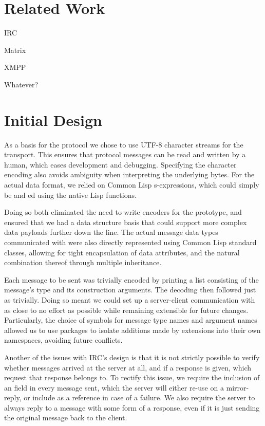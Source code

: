 \documentclass[format=sigconf]{acmart}
\begin{document}
\section{Related Work}\label{relatedwork}
IRC

Matrix

XMPP

Whatever?

\section{Initial Design}\label{initial-design}
As a basis for the protocol we chose to use UTF-8 character streams for the transport. This ensures that protocol messages can be read and written by a human, which eases development and debugging. Specifying the character encoding also avoids ambiguity when interpreting the underlying bytes. For the actual data format, we relied on Common Lisp s-expressions, which could simply be  and ed using the native Lisp functions.

Doing so both eliminated the need to write encoders for the prototype, and ensured that we had a data structure basis that could support more complex data payloads further down the line. The actual message data types communicated with were also directly represented using Common Lisp standard classes, allowing for tight encapsulation of data attributes, and the natural combination thereof through multiple inheritance.

Each message to be sent was trivially encoded by printing a list consisting of the message's type and its construction arguments. The decoding then followed just as trivially. Doing so meant we could set up a server-client communication with as close to no effort as possible while remaining extensible for future changes. Particularly, the choice of symbols for message type names and argument names allowed us to use packages to isolate additions made by extensions into their own namespaces, avoiding future conflicts.

Another of the issues with IRC's design is that it is not strictly possible to verify whether messages arrived at the server at all, and if a response is given, which request that response belongs to. To rectify this issue, we require the inclusion of an  field in every message sent, which the server will either re-use on a mirror-reply, or include as a reference in case of a failure. We also require the server to always reply to a message with some form of a response, even if it is just sending the original message back to the client.
\end{document}
